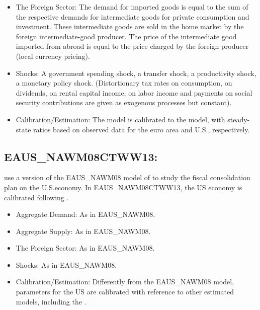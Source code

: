 \documentclass[11pt,a4paper]{article}
\begin{document}
\begin{itemize}
		\item The Foreign Sector: The demand for imported goods is equal to the sum of the respective demands for intermediate goods for private consumption and investment. These intermediate goods are sold in the home market by the foreign intermediate-good producer. The price of the intermediate good imported from abroad is equal to the price charged by the foreign producer (local currency pricing).
		
		\item Shocks: A government spending shock, a transfer shock, a productivity shock, a monetary policy shock. (Distortionary tax rates on consumption, on dividends, on rental capital income, on labor income and payments on social security contributions are given as exogenous processes but constant).
		
		\item Calibration/Estimation: The model is calibrated to the \cite{SmetsWouters2003} model, with steady-state ratios based on observed data for the euro area and U.S., respectively.
		
		
	\end{itemize}
	
	
	
	\subsection{EAUS\_NAWM08CTWW13: \cite{CoganTaylorWielandWolters2013}}
	\label{EAUSNAWM08CTWW13}
	
	\cite{CoganTaylorWielandWolters2013} use a version of the EAUS\_NAWM08 model of \cite{CoenenMcAdamStraub2008} to study the fiscal consolidation plan on the U.S.economy. In EAUS\_NAWM08CTWW13, the US economy is calibrated following \cite{CoganCwikTaylorWieland2010}.
	
	\begin{itemize}
		
		\item Aggregate Demand: As in EAUS\_NAWM08.
		
		\item Aggregate Supply: As in EAUS\_NAWM08.
		
		\item The Foreign Sector: As in EAUS\_NAWM08.
		
		\item Shocks: As in EAUS\_NAWM08.
		
		\item Calibration/Estimation: Differently from the EAUS\_NAWM08 model, parameters for the US are calibrated with reference to other estimated models, including the \cite{CoganCwikTaylorWieland2010}.
		
		
	\end{itemize}
	
\end{document}
